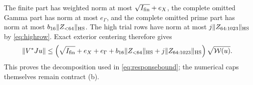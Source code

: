 The finite part has weighted norm at most $\sqrt{I_{\rm fin}}+e_X$,
the complete omitted Gamma part has norm at most $e_\Gamma$,
and the complete omitted prime part has norm at most
$b_{16}\lVert Z_{<64}\rVert_{\mathrm{HS}}$.
The high trial rows have norm at most $j\lVert Z_{64:1023}\rVert_{\mathrm{HS}}$ by
\eqref{eq:highrow}. Exact exterior centering therefore gives
\[
 \lVert V^*Ju\rVert\le
 \left(\sqrt{I_{\rm fin}}+e_X+e_\Gamma+
 b_{16}\lVert Z_{<64}\rVert_{\mathrm{HS}}
 +j\lVert Z_{64:1023}\rVert_{\mathrm{HS}}\right)\sqrt{\mathcal W(u)}.
\]
This proves the decomposition used in \eqref{eq:responsebound};
the numerical caps themselves remain contract (b).
